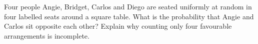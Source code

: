 Four people Angie, Bridget, Carlos and Diego are seated uniformly at random in four labelled seats around a square table. What is the probability that Angie and Carlos sit opposite each other? Explain why counting only four favourable arrangements is incomplete.
